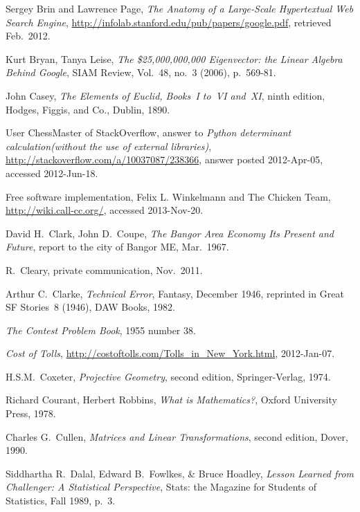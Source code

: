 \begin{thebibliography}{\makebox[2em][c]{{}\hfil{}}}
  Sergey Brin and Lawrence Page,
  \emph{The Anatomy of a Large-Scale Hypertextual
        Web Search Engine},
  \url{http://infolab.stanford.edu/pub/papers/google.pdf},
  retrieved Feb.~2012.

  Kurt Bryan, Tanya Leise,
  \emph{The \$25,000,000,000 Eigenvector: the Linear Algebra Behind Google},
  SIAM Review, 
  Vol.\ 48, no.\ 3 (2006), p.\ 569-81. 

  John Casey,
  \emph{The Elements of Euclid, Books~I to~VI and~XI},
  ninth edition,
  Hodges, Figgis, and Co.,
  Dublin,
  1890.

  User ChessMaster of StackOverflow,
  answer to   
  \textit{Python determinant calculation(without the use of external libraries)},
  \url{http://stackoverflow.com/a/10037087/238366},
  answer posted 2012-Apr-05,
  accessed 2012-Jun-18.

  Free software implementation,
  Felix L. Winkelmann and The Chicken Team,
  \url{http://wiki.call-cc.org/},
  accessed 2013-Nov-20.

  David H.\ Clark, John D.\ Coupe,
  \emph{The Bangor Area Economy Its Present and Future},
  report to the city of Bangor ME,
  Mar.\ 1967.

  R.~Cleary,
  private communication,
  Nov.\ 2011.

  Arthur C.~Clarke,
  \emph{Technical Error},
  Fantasy, December 1946,
  reprinted in
  Great SF Stories~8 (1946),
  DAW Books, 1982. 

  \emph{The Contest Problem Book},
  1955 number 38.

  \emph{Cost of Tolls},
  \url{http://costoftolls.com/Tolls_in_New_York.html},
  2012-Jan-07.

  H.S.M.~Coxeter,
  \emph{Projective Geometry},
  second edition,
  Springer-Verlag, 1974.

  Richard Courant, Herbert Robbins,
  \emph{What is Mathematics?},
  Oxford University Press, 1978.

  Charles G.\ Cullen,
  \emph{Matrices and Linear Transformations},
  second edition,
  Dover,
  1990.

  Siddhartha R.~Dalal, Edward B.~Fowlkes, \& Bruce Hoadley,
  \emph{Lesson Learned from Challenger: A Statistical Perspective},
  Stats: the Magazine for Students of Statistics,
  Fall 1989,
  p.~3.


\end{thebibliography}
